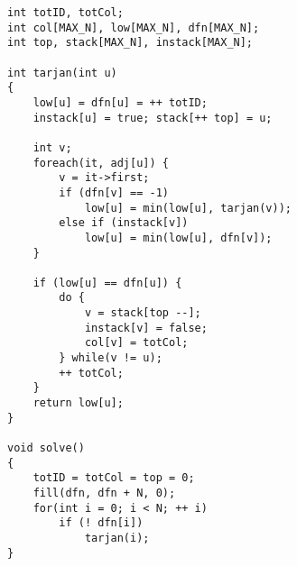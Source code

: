 \begin{lstlisting}
int totID, totCol;
int col[MAX_N], low[MAX_N], dfn[MAX_N];
int top, stack[MAX_N], instack[MAX_N];

int tarjan(int u)
{
	low[u] = dfn[u] = ++ totID;
	instack[u] = true; stack[++ top] = u;
	
	int v;
	foreach(it, adj[u]) {
		v = it->first;
		if (dfn[v] == -1)
			low[u] = min(low[u], tarjan(v));
		else if (instack[v])
			low[u] = min(low[u], dfn[v]);
	}
	
	if (low[u] == dfn[u]) {
		do {
			v = stack[top --];
			instack[v] = false;
			col[v] = totCol;
		} while(v != u);
		++ totCol;
	}
	return low[u];
}

void solve()
{
	totID = totCol = top = 0;
	fill(dfn, dfn + N, 0);
	for(int i = 0; i < N; ++ i)
		if (! dfn[i])
			tarjan(i);
}
\end{lstlisting}
